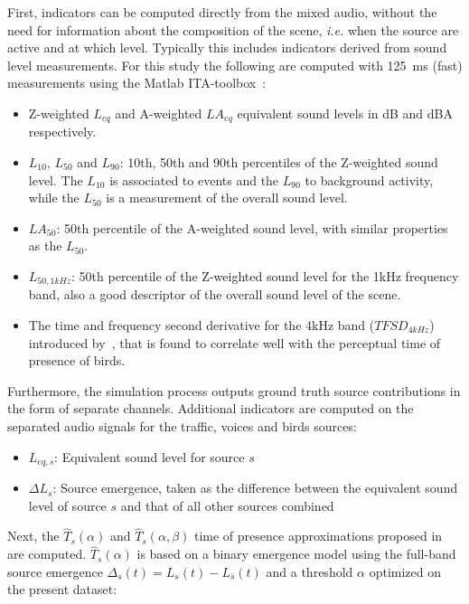 \documentclass[11pt,a4paper]{article}
\begin{document}
First, indicators can be computed directly from the mixed audio, without the need for information about the composition of the scene, \textit{i.e.} when the source are active and at which level. Typically this includes indicators derived from sound level measurements. For this study the following are computed with 125~ms (fast) measurements using the Matlab ITA-toolbox~\cite{ita}:

\begin{itemize}
\item Z-weighted $L_{eq}$ and A-weighted $LA_{eq}$ equivalent sound levels in dB and dBA respectively.
\item $L_{10}$, $L_{50}$ and $L_{90}$: 10th, 50th and 90th percentiles of the Z-weighted sound level. The $L_{10}$ is associated to events and the $L_{90}$ to background activity, while the $L_{50}$ is a measurement of the overall sound level.
\item $LA_{50}$: 50th percentile of the A-weighted sound level, with similar properties as the $L_{50}$.
\item $L_{50, 1kHz}$: 50th percentile of the Z-weighted sound level for the 1kHz frequency band, also a good descriptor of the overall sound level of the scene.
\item The time and frequency second derivative for the 4kHz band ($TFSD_{4kHz}$) introduced by~\cite{aumond}, that is found to correlate well with the perceptual time of presence of birds.
\end{itemize}

Furthermore, the simulation process outputs ground truth source contributions in the form of separate channels. Additional indicators are computed on the separated audio signals for the traffic, voices and birds sources:

\begin{itemize}
\item $L_{eq, s}$: Equivalent sound level for source $s$
\item $\Delta L_{s}$: Source emergence, taken as the difference between the equivalent sound level of source $s$ and that of all other sources combined
\end{itemize}

Next, the $\hat T_s(\alpha)$ and $\hat T_s(\alpha, \beta)$ time of presence approximations proposed in~\cite{gontier} are computed. $\hat T_s(\alpha)$ is based on a binary emergence model using the full-band source emergence $\Delta_s(t) = L_s(t) - L_{\bar{s}}(t)$ and a threshold $\alpha$ optimized on the present dataset:
\end{document}
